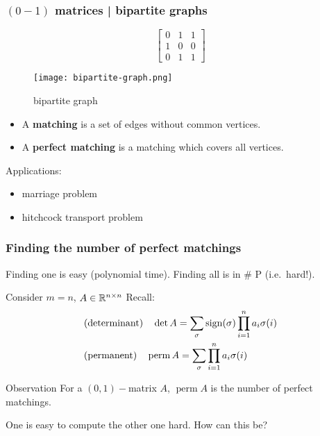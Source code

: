 \documentclass{beamer}
\DeclareMathOperator*{\perm}{perm}
\begin{document}
\begin{frame}
  \frametitle{$(0-1)$ matrices | bipartite graphs}
  \begin{minipage}{0.5\textwidth}
    \begin{equation}
      \begin{bmatrix}
        0 & 1 & 1 \\
        1 & 0 & 0 \\
        0 & 1 & 1
      \end{bmatrix}
    \end{equation}
  \end{minipage}
  \begin{minipage}{0.35\textwidth}
    \begin{figure}[ht]
      \centering
      \texttt{[image: bipartite-graph.png]}
      \caption{bipartite graph}
    \end{figure}
  \end{minipage}

    \begin{definition}
      \begin{itemize}
        \item A \textbf{matching} is a set of edges without common vertices.
        \item A \textbf{perfect matching} is a matching which covers all vertices.
      \end{itemize}
    \end{definition}
    Applications:
    \begin{itemize}
      \item marriage problem
      \item hitchcock transport problem
    \end{itemize}
\end{frame}

\begin{frame}
  \frametitle{Finding the number of perfect matchings}
  Finding one is easy (polynomial time).
  Finding all is in \# P (i.e.\ hard!).
  \begin{block}{Consider $m=n$, $A\in \mathbb{R}^{n \times n}$}
    Recall:
    \begin{equation}
      \begin{aligned}
        &\text{(determinant)} \quad \det A = \sum_{\sigma} \sign(\sigma) \prod_{i=1}^n a_i \sigma(i) \\
        &\text{(permanent)} \quad \perm A = \sum_{\sigma} \prod_{i=1}^n a_i \sigma(i)
      \end{aligned}
    \end{equation}
  \end{block}
  \begin{block}{Observation}
    For a $(0,1)-$matrix $A$, $\perm A$ is the number of perfect matchings.
  \end{block}
  One is easy to compute the other one hard. How can this be?
\end{frame}
\end{document}
